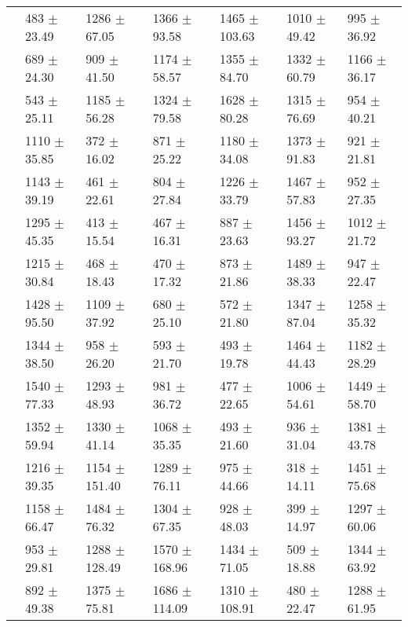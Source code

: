 \begin{table}
{\begin{tabular}[t]{rllllll}
\multirow{-2}{*}{\raggedleft\arraybackslash 7} & 483 $\pm$ 23.49 & 1286 $\pm$ 67.05 & 1366 $\pm$ 93.58 & 1465 $\pm$ 103.63 & 1010 $\pm$ 49.42 & 995 $\pm$ 36.92\\
\cmidrule{1-7}
 & 689 $\pm$ 24.30 & 909 $\pm$ 41.50 & 1174 $\pm$ 58.57 & 1355 $\pm$ 84.70 & 1332 $\pm$ 60.79 & 1166 $\pm$ 36.17\\

\multirow{-2}{*}{\raggedleft\arraybackslash 8} & 543 $\pm$ 25.11 & 1185 $\pm$ 56.28 & 1324 $\pm$ 79.58 & 1628 $\pm$ 80.28 & 1315 $\pm$ 76.69 & 954 $\pm$ 40.21\\
\cmidrule{1-7}
 & 1110 $\pm$ 35.85 & 372 $\pm$ 16.02 & 871 $\pm$ 25.22 & 1180 $\pm$ 34.08 & 1373 $\pm$ 91.83 & 921 $\pm$ 21.81\\

\multirow{-2}{*}{\raggedleft\arraybackslash 9} & 1143 $\pm$ 39.19 & 461 $\pm$ 22.61 & 804 $\pm$ 27.84 & 1226 $\pm$ 33.79 & 1467 $\pm$ 57.83 & 952 $\pm$ 27.35\\
\cmidrule{1-7}
 & 1295 $\pm$ 45.35 & 413 $\pm$ 15.54 & 467 $\pm$ 16.31 & 887 $\pm$ 23.63 & 1456 $\pm$ 93.27 & 1012 $\pm$ 21.72\\

\multirow{-2}{*}{\raggedleft\arraybackslash 10} & 1215 $\pm$ 30.84 & 468 $\pm$ 18.43 & 470 $\pm$ 17.32 & 873 $\pm$ 21.86 & 1489 $\pm$ 38.33 & 947 $\pm$ 22.47\\
\cmidrule{1-7}
 & 1428 $\pm$ 95.50 & 1109 $\pm$ 37.92 & 680 $\pm$ 25.10 & 572 $\pm$ 21.80 & 1347 $\pm$ 87.04 & 1258 $\pm$ 35.32\\

\multirow{-2}{*}{\raggedleft\arraybackslash 11} & 1344 $\pm$ 38.50 & 958 $\pm$ 26.20 & 593 $\pm$ 21.70 & 493 $\pm$ 19.78 & 1464 $\pm$ 44.43 & 1182 $\pm$ 28.29\\
\cmidrule{1-7}
 & 1540 $\pm$ 77.33 & 1293 $\pm$ 48.93 & 981 $\pm$ 36.72 & 477 $\pm$ 22.65 & 1006 $\pm$ 54.61 & 1449 $\pm$ 58.70\\

\multirow{-2}{*}{\raggedleft\arraybackslash 12} & 1352 $\pm$ 59.94 & 1330 $\pm$ 41.14 & 1068 $\pm$ 35.35 & 493 $\pm$ 21.60 & 936 $\pm$ 31.04 & 1381 $\pm$ 43.78\\
\cmidrule{1-7}
 & 1216 $\pm$ 39.35 & 1154 $\pm$ 151.40 & 1289 $\pm$ 76.11 & 975 $\pm$ 44.66 & 318 $\pm$ 14.11 & 1451 $\pm$ 75.68\\

\multirow{-2}{*}{\raggedleft\arraybackslash 13} & 1158 $\pm$ 66.47 & 1484 $\pm$ 76.32 & 1304 $\pm$ 67.35 & 928 $\pm$ 48.03 & 399 $\pm$ 14.97 & 1297 $\pm$ 60.06\\
\cmidrule{1-7}
 & 953 $\pm$ 29.81 & 1288 $\pm$ 128.49 & 1570 $\pm$ 168.96 & 1434 $\pm$ 71.05 & 509 $\pm$ 18.88 & 1344 $\pm$ 63.92\\

\multirow{-2}{*}{\raggedleft\arraybackslash 14} & 892 $\pm$ 49.38 & 1375 $\pm$ 75.81 & 1686 $\pm$ 114.09 & 1310 $\pm$ 108.91 & 480 $\pm$ 22.47 & 1288 $\pm$ 61.95\\
\bottomrule
\end{tabular}}
\end{table}
